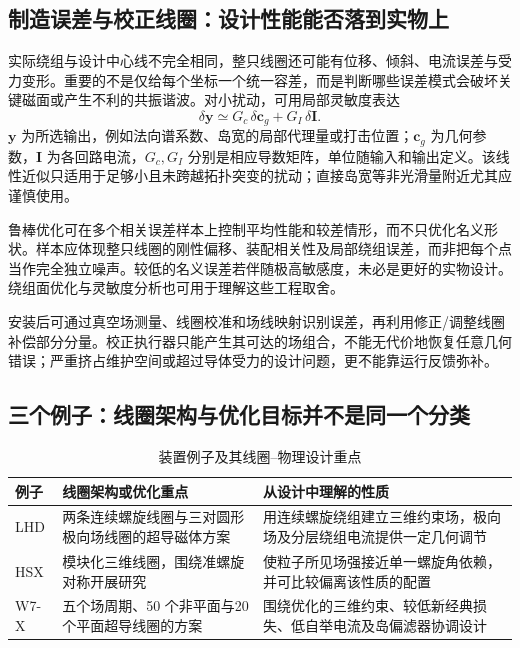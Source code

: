 \documentclass[12pt,fontset=none]{ctexart}
\numberwithin{equation}{section}
\numberwithin{table}{section}
\numberwithin{figure}{section}
\begin{document}
\subsection{制造误差与校正线圈：设计性能能否落到实物上}\label{sec:stellarator-robustness}

实际绕组与设计中心线不完全相同，整只线圈还可能有位移、倾斜、电流误差与受力变形。重要的不是仅给每个坐标一个统一容差，而是判断哪些误差模式会破坏关键磁面或产生不利的共振谐波。对小扰动，可用局部灵敏度表达
\begin{equation}\label{eq:stellarator-sensitivity}
 \delta\bm y\simeq G_c\,\delta\bm c_g+G_I\,\delta\bm I.
\end{equation}
$\bm y$ 为所选输出，例如法向谱系数、岛宽的局部代理量或打击位置；$\bm c_g$ 为几何参数，$\bm I$ 为各回路电流，$G_c,G_I$ 分别是相应导数矩阵，单位随输入和输出定义。该线性近似只适用于足够小且未跨越拓扑突变的扰动；直接岛宽等非光滑量附近尤其应谨慎使用。

鲁棒优化可在多个相关误差样本上控制平均性能和较差情形，而不只优化名义形状。样本应体现整只线圈的刚性偏移、装配相关性及局部绕组误差，而非把每个点当作完全独立噪声。较低的名义误差若伴随极高敏感度，未必是更好的实物设计。绕组面优化与灵敏度分析也可用于理解这些工程取舍\cite{Sadjoint}。

安装后可通过真空场测量、线圈校准和场线映射识别误差，再利用修正/调整线圈补偿部分分量。校正执行器只能产生其可达的场组合，不能无代价地恢复任意几何错误；严重挤占维护空间或超过导体受力的设计问题，更不能靠运行反馈弥补。

\subsection{三个例子：线圈架构与优化目标并不是同一个分类}\label{sec:stellarator-examples}

\begin{table}[htbp]
\centering\small
\caption{装置例子及其线圈--物理设计重点}\label{tab:stellarator-examples}
\begin{tabular}{L{1.7cm}L{5.4cm}L{6.4cm}}
\toprule 例子 & 线圈架构或优化重点 & 从设计中理解的性质 \\
\midrule
LHD & 两条连续螺旋线圈与三对圆形极向场线圈的超导磁体方案 & 用连续螺旋绕组建立三维约束场，极向场及分层绕组电流提供一定几何调节 \\
HSX & 模块化三维线圈，围绕准螺旋对称开展研究 & 使粒子所见场强接近单一螺旋角依赖，并可比较偏离该性质的配置 \\
W7-X & 五个场周期、50 个非平面与20 个平面超导线圈的方案 & 围绕优化的三维约束、较低新经典损失、低自举电流及岛偏滤器协调设计 \\
\bottomrule
\end{tabular}
\end{table}
\end{document}
